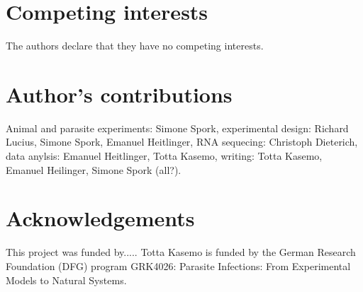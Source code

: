 \documentclass{bmcart}
\begin{document}
\begin{backmatter}

\section*{Competing interests}
  The authors declare that they have no competing interests.

\section*{Author's contributions}
Animal and parasite experiments: Simone Spork, experimental design: Richard Lucius, Simone Spork, Emanuel Heitlinger, RNA sequecing: Christoph Dieterich, data anylsis: Emanuel Heitlinger, Totta Kasemo, writing: Totta Kasemo, Emanuel Heilinger, Simone Spork (all?).

\section*{Acknowledgements}
This project was funded by..... Totta Kasemo is funded by the German Research Foundation (DFG) program GRK4026: Parasite Infections: From Experimental Models to Natural Systems. 



\end{backmatter}
\end{document}
